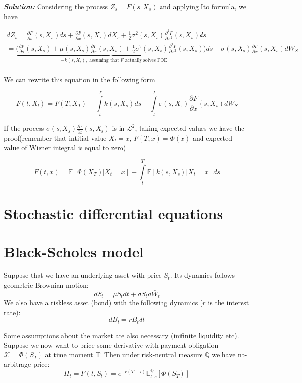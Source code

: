 \documentclass[a4paper, 12pt]{article}
\theoremstyle{problemstyle}
\newenvironment{solution}
{\textit{\textbf{Solution:}}}
{}
\newcommand{\E}{\mathbb{E}}
\begin{document}
\begin{solution}
Considering the process $Z_s = F(s, X_s)$ and applying Ito formula, we have

\begin{multline*}
dZ_s = \frac{\partial F }{\partial s} (s, X_s) ds + \frac{\partial F }{\partial x} (s, X_s) dX_s + \frac{1}{2} \sigma^2(s, X_s) \frac{\partial^2 F}{\partial x^2} (s, X_s)ds = \\ =\underbrace{\Big( \frac{\partial F }{\partial s} (s, X_s) + \mu(s, X_s) \frac{\partial F }{\partial x} (s, X_s)  + \frac{1}{2} \sigma^2(s, X_s) \frac{\partial^2 F}{\partial x^2} (s, X_s)\Big)}_{= -k(s, X_s), \text{ assuming that $F$ actually solves PDE} }ds + \sigma(s, X_s)\frac{\partial F }{\partial x} (s, X_s) dW_S \\
\end{multline*}

We can rewrite this equation in the following form

$$
F(t, X_t) = F(T, X_T) + \int\limits_{t}^{T}k(s,X_s)ds - \int\limits_{t}^{T}\sigma(s, X_s)\frac{\partial F }{\partial x} (s, X_s) dW_S
$$

If the process $\sigma(s, X_s)\frac{\partial F }{\partial x} (s, X_s)$ is in $\mathcal{L}^2 $, taking expected values we have the proof(remember that intitial value $X_t = x$, $F(T,x) = \Phi(x)$ and expected value of Wiener integral is equal to zero)

$$
F(t,x) = \E[\Phi(X_T)|X_t = x] + \int\limits_{t}^{T} \E[k(s,X_s)|X_t = x]ds
$$
\end{solution}




\section{Stochastic differential equations}






\section{Black-Scholes model}
Suppose that we have an underlying asset with price $S_t$. Its dynamics follows geometric Brownian motion:
$$
dS_t = \mu S_tdt + \sigma S_t d\bar{W}_t
$$
We also have a riskless asset (bond) with the following dynamics ($r$ is the interest rate):
$$
dB_t = rB_tdt
$$


 Some assumptions about the market are also necessary (inifinite liquidity etc). 
Suppose we now want to price some derivative with payment obligation $\mathcal{X} = \Phi(S_T)$ at time moment T. Then under risk-neutral measure $\mathbb{Q}$ we have no-arbitrage price:
$$
\Pi_t = F(t, S_t) = e^{-r(T-t)}\E^{\mathbb{Q}}_{t, s} [\Phi(S_T)]
$$
\end{document}
